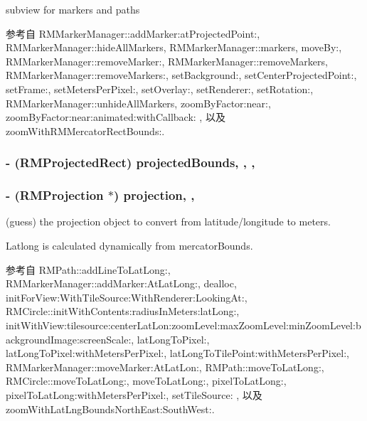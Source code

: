 subview for markers and paths 



参考自 R\-M\-Marker\-Manager\-::add\-Marker\-:at\-Projected\-Point\-:, R\-M\-Marker\-Manager\-::hide\-All\-Markers, R\-M\-Marker\-Manager\-::markers, move\-By\-:, R\-M\-Marker\-Manager\-::remove\-Marker\-:, R\-M\-Marker\-Manager\-::remove\-Markers, R\-M\-Marker\-Manager\-::remove\-Markers\-:, set\-Background\-:, set\-Center\-Projected\-Point\-:, set\-Frame\-:, set\-Meters\-Per\-Pixel\-:, set\-Overlay\-:, set\-Renderer\-:, set\-Rotation\-:, R\-M\-Marker\-Manager\-::unhide\-All\-Markers, zoom\-By\-Factor\-:near\-:, zoom\-By\-Factor\-:near\-:animated\-:with\-Callback\-: , 以及 zoom\-With\-R\-M\-Mercator\-Rect\-Bounds\-:.

\hypertarget{interface_r_m_map_contents_a46afa80adb2b126e05dfaf6501f17eea}{
\subsubsection[{projected\-Bounds}]{\setlength{\rightskip}{0pt plus 5cm}-\/ ({\bf R\-M\-Projected\-Rect}) projected\-Bounds\hspace{0.3cm}{\ttfamily [read]}, {\ttfamily [write]}, {\ttfamily [atomic]}, {\ttfamily [assign]}}}\label{interface_r_m_map_contents_a46afa80adb2b126e05dfaf6501f17eea}
\hypertarget{interface_r_m_map_contents_ac83cbe1542e19defe75afc557007e282}{
\subsubsection[{projection}]{\setlength{\rightskip}{0pt plus 5cm}-\/ ({\bf R\-M\-Projection} $\ast$) projection\hspace{0.3cm}{\ttfamily [read]}, {\ttfamily [atomic]}, {\ttfamily [assign]}}}\label{interface_r_m_map_contents_ac83cbe1542e19defe75afc557007e282}


(guess) the projection object to convert from latitude/longitude to meters. 

Latlong is calculated dynamically from mercator\-Bounds. 

参考自 R\-M\-Path\-::add\-Line\-To\-Lat\-Long\-:, R\-M\-Marker\-Manager\-::add\-Marker\-:\-At\-Lat\-Long\-:, dealloc, init\-For\-View\-:\-With\-Tile\-Source\-:\-With\-Renderer\-:\-Looking\-At\-:, R\-M\-Circle\-::init\-With\-Contents\-:radius\-In\-Meters\-:lat\-Long\-:, init\-With\-View\-:tilesource\-:center\-Lat\-Lon\-:zoom\-Level\-:max\-Zoom\-Level\-:min\-Zoom\-Level\-:background\-Image\-:screen\-Scale\-:, lat\-Long\-To\-Pixel\-:, lat\-Long\-To\-Pixel\-:with\-Meters\-Per\-Pixel\-:, lat\-Long\-To\-Tile\-Point\-:with\-Meters\-Per\-Pixel\-:, R\-M\-Marker\-Manager\-::move\-Marker\-:\-At\-Lat\-Lon\-:, R\-M\-Path\-::move\-To\-Lat\-Long\-:, R\-M\-Circle\-::move\-To\-Lat\-Long\-:, move\-To\-Lat\-Long\-:, pixel\-To\-Lat\-Long\-:, pixel\-To\-Lat\-Long\-:with\-Meters\-Per\-Pixel\-:, set\-Tile\-Source\-: , 以及 zoom\-With\-Lat\-Lng\-Bounds\-North\-East\-:\-South\-West\-:.

